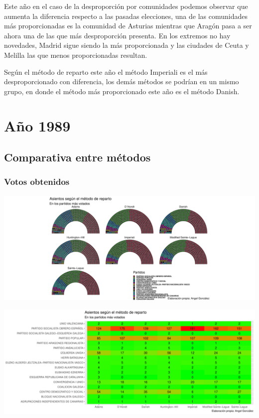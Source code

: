 \documentclass[12pt,a4paper,]{book}
\numberwithin{dummy}{section}
\theoremstyle{ocrenumbox}
\theoremstyle{blacknumex}
\theoremstyle{blacknumbox}
\theoremstyle{ocrenum}
\theoremstyle{ocrenum}
\begin{document}
Este año en el caso de la desproporción por comunidades podemos observar
que aumenta la diferencia respecto a las pasadas elecciones, una de las
comunidades más proporcionadas es la comunidad de Asturias mientras que
Aragón pasa a ser ahora una de las que más desproporción presenta. En
los extremos no hay novedades, Madrid sigue siendo la más proporcionada
y las ciudades de Ceuta y Melilla las que menos proporcionadas resultan.

Según el método de reparto este año el método Imperiali es el más
desproporcionado con diferencia, los demás métodos se podrían en un
mismo grupo, en donde el método más proporcionado este año es el método
Danish.

\hypertarget{auxf1o-1989}{%
\section{Año 1989}\label{auxf1o-1989}}

\hypertarget{comparativa-entre-muxe9todos-4}{%
\subsection{Comparativa entre
métodos}\label{comparativa-entre-muxe9todos-4}}

\hypertarget{votos-obtenidos-4}{%
\subsubsection{Votos obtenidos}\label{votos-obtenidos-4}}

\begin{center}\includegraphics[width=0.95\linewidth]{figurasR/unnamed-chunk-98-1} \end{center}

\begin{center}\includegraphics[width=0.95\linewidth]{figurasR/unnamed-chunk-98-2} \end{center}
\end{document}
